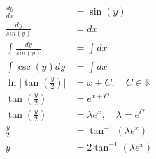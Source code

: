 \begin{align*}
	\frac{dy}{dx} &= \sin(y) \\
	\frac{dy}{sin(y)} &= dx \\
	\int \frac {dy}{sin(y)} &= \int dx \\
	\int \csc(y) dy &= \int dx \\
	\ln \lvert \tan(\frac{y}{2}) \lvert &= x + C, \quad C \in \mathbb{R} \\
	\tan(\frac{y}{2}) &= e^{x + C} \\
	\tan(\frac{y}{2}) &= \lambda e^{x}, \quad \lambda = e^{C} \\
	\frac{y}{2} &= \tan^{-1}(\lambda e^{x}) \\
	y &= 2\tan^{-1}(\lambda e^{x})
\end{align*}

